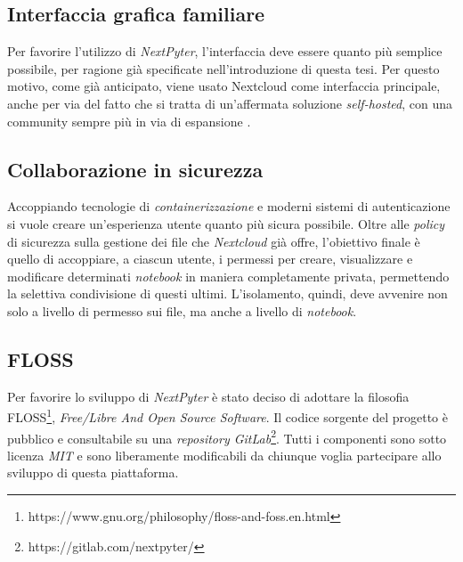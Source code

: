 \subsection{Interfaccia grafica familiare}
Per favorire l'utilizzo di \textit{NextPyter}, l'interfaccia deve essere quanto più semplice possibile, per ragione già specificate nell'introduzione di questa tesi. 
\newline
Per questo motivo, come già anticipato, viene usato Nextcloud come interfaccia principale, anche per via del fatto che si tratta di un'affermata soluzione \textit{self-hosted}, con una community sempre più in via di espansione \cite{nextcloud-growing}.

\subsection{Collaborazione in sicurezza}
Accoppiando tecnologie di \textit{containerizzazione} e moderni sistemi di autenticazione si vuole creare un'esperienza utente quanto più sicura possibile. \newline
Oltre alle \textit{policy} di sicurezza sulla gestione dei file che \textit{Nextcloud} già offre, l'obiettivo finale è quello di accoppiare, a ciascun utente, i permessi per creare, visualizzare e modificare determinati \textit{notebook} in maniera completamente privata, permettendo la selettiva condivisione di questi ultimi.
\newline
L'isolamento, quindi, deve avvenire non solo a livello di permesso sui file, ma anche a livello di \textit{notebook}.

\subsection{FLOSS}
Per favorire lo sviluppo di \textit{NextPyter} è stato deciso di adottare la filosofia FLOSS\footnote{https://www.gnu.org/philosophy/floss-and-foss.en.html}, \textit{Free/Libre And Open Source Software}. Il codice sorgente del progetto è pubblico e consultabile su una \textit{repository GitLab}\footnote{https://gitlab.com/nextpyter/}. Tutti i componenti sono sotto licenza \textit{MIT} e sono liberamente modificabili da chiunque voglia partecipare allo sviluppo di questa piattaforma.

\newpage

